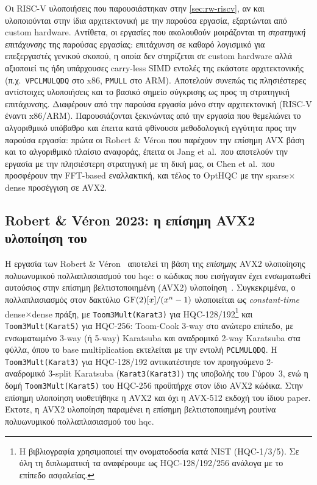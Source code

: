 Οι RISC-V υλοποιήσεις που παρουσιάστηκαν στην \cref{sec:rw-riscv}, αν και υλοποιούνται στην ίδια
αρχιτεκτονική με την παρούσα εργασία, εξαρτώνται από custom hardware. Αντίθετα, οι
εργασίες που ακολουθούν μοιράζονται τη \emph{στρατηγική επιτάχυνσης} της παρούσας
εργασίας: επιτάχυνση σε καθαρό λογισμικό για επεξεργαστές γενικού σκοπού, η οποία
δεν στηρίζεται σε custom hardware αλλά αξιοποιεί τις ήδη υπάρχουσες carry-less SIMD
εντολές της εκάστοτε αρχιτεκτονικής (π.χ.\ \texttt{VPCLMULQDQ} στο x86, 
\texttt{PMULL} στο ARM). Αποτελούν συνεπώς τις πλησιέστερες αντίστοιχες υλοποιήσεις και το βασικό
σημείο σύγκρισης ως προς τη στρατηγική επιτάχυνσης. Διαφέρουν από την παρούσα
εργασία μόνο στην αρχιτεκτονική (RISC-V έναντι x86/ARM). Παρουσιάζονται 
ξεκινώντας από την εργασία που θεμελιώνει το αλγοριθμικό υπόβαθρο και 
έπειτα κατά φθίνουσα μεθοδολογική εγγύτητα προς την παρούσα εργασία: 
πρώτα οι Robert \& Véron που παρέχουν την επίσημη AVX βάση και το 
αλγοριθμικό πλαίσιο αναφοράς, έπειτα οι Jang et al.\ που αποτελούν την 
εργασία με την πλησιέστερη στρατηγική με τη δική μας, οι Chen et al.\ που προσφέρουν 
την FFT-based εναλλακτική, και τέλος το OptHQC με την sparse$\times$dense προσέγγιση σε AVX2.

\subsection{Robert \& Véron 2023: η επίσημη AVX2 υλοποίηση του \HQC}
\label{ssec:rw-robert-veron}

Η εργασία των Robert \& Véron~\cite{RobertVeron2023-avx512-gf2x} αποτελεί τη 
βάση της \emph{επίσημης} AVX2 υλοποίησης πολυωνυμικού πολλαπλασιασμού 
του \gls{hqc}: ο κώδικας που εισήγαγαν έχει ενσωματωθεί αυτούσιος 
στην επίσημη βελτιστοποιημένη (AVX2) υλοποίηση~\cite{HQC-reference-impl}. 
Συγκεκριμένα, ο πολλαπλασιασμός στον δακτύλιο $\mathrm{GF}(2)[x]/(x^n-1)$ 
υλοποιείται ως \emph{constant-time} dense$\times$dense πράξη, με 
\texttt{Toom3Mult(Karat3)} για HQC-128/192\footnote{Η βιβλιογραφία 
χρησιμοποιεί την ονοματοδοσία κατά NIST (HQC-1/3/5). Σε όλη τη 
διπλωματική τα αναφέρουμε ως HQC-128/192/256 ανάλογα με το επίπεδο 
ασφαλείας.} και \texttt{Toom3Mult(Karat5)} 
για HQC-256: Toom-Cook 3-way στο ανώτερο επίπεδο, με ενσωματωμένο 3-way 
(ή 5-way) Karatsuba και αναδρομικό 2-way Karatsuba στα φύλλα, όπου το 
base multiplication εκτελείται με την εντολή \texttt{PCLMULQDQ}. 
Η \texttt{Toom3Mult(Karat3)} για HQC-128/192 αντικατέστησε τον 
προηγούμενο 2-αναδρομικό 3-split Karatsuba (\texttt{Karat3(Karat3)}) 
της υποβολής του Γύρου~3, 
ενώ η δομή \texttt{Toom3Mult(Karat5)} του HQC-256 προϋπήρχε στον ίδιο 
AVX2 κώδικα. Στην επίσημη υλοποίηση υιοθετήθηκε η AVX2 και όχι η 
AVX-512 εκδοχή του ίδιου paper. Έκτοτε, η AVX2 υλοποίηση παραμένει η επίσημη 
βελτιστοποιημένη ρουτίνα πολυωνυμικού πολλαπλασιασμού του \gls{hqc}. 

